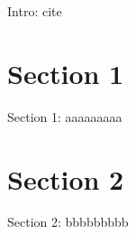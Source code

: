 \minitoc

\vspace{0.5cm}
Intro: cite \cite{cochrane2009asset}

\section{Section 1}
Section 1: aaaaaaaaa

\section{Section 2}
Section 2: bbbbbbbbb